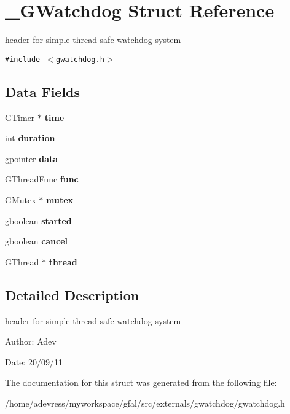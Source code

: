 \section{\_\-GWatchdog Struct Reference}
\label{struct__GWatchdog}
header for simple thread-safe watchdog system  


{\tt \#include $<$gwatchdog.h$>$}

\subsection*{Data Fields}
\begin{CompactItemize}
\item 
GTimer $\ast$ \textbf{time}\label{struct__GWatchdog_054b23f1c0f1fc537ea73efd48390e79}

\item 
int \textbf{duration}\label{struct__GWatchdog_fa60e3cfbc4bdc43e7b6d6ed432f4fe6}

\item 
gpointer \textbf{data}\label{struct__GWatchdog_ae813719ce24164750d8610224661082}

\item 
GThread\-Func \textbf{func}\label{struct__GWatchdog_60c60748fe025c27223b4ce032f5d368}

\item 
GMutex $\ast$ \textbf{mutex}\label{struct__GWatchdog_671e29f5e58b6a185c3fa2d3ac49ae98}

\item 
gboolean \textbf{started}\label{struct__GWatchdog_229b702a537127429204d00bdfcb5b2b}

\item 
gboolean \textbf{cancel}\label{struct__GWatchdog_f0f249f8babbe7fdb95379281a57f29f}

\item 
GThread $\ast$ \textbf{thread}\label{struct__GWatchdog_0e171346bb7f7a4346e2a2f775aa0ab4}

\end{CompactItemize}


\subsection{Detailed Description}
header for simple thread-safe watchdog system 

\begin{Desc}
\item[Author:]Adev \end{Desc}
\begin{Desc}
\item[Date:]20/09/11 \end{Desc}




The documentation for this struct was generated from the following file:\begin{CompactItemize}
\item 
/home/adevress/myworkspace/gfal/src/externals/gwatchdog/gwatchdog.h\end{CompactItemize}
